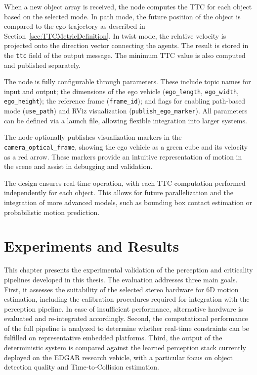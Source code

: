 When a new object array is received, the node computes the TTC 
for each object based on the selected mode. In path mode, the future 
position of the object is compared to the ego trajectory as described 
in Section~\ref{sec:TTCMetricDefinition}. In twist mode, the relative 
velocity is projected onto the direction vector connecting the agents. 
The result is stored in the \texttt{ttc} field of the output message. 
The minimum TTC value is also computed and published separately.

The node is fully configurable through parameters. These include 
topic names for input and output; the dimensions of the ego vehicle 
(\texttt{ego\_length}, \texttt{ego\_width}, \texttt{ego\_height}); the 
reference frame (\texttt{frame\_id}); and flags for enabling path-based 
mode (\texttt{use\_path}) and RViz visualization 
(\texttt{publish\_ego\_marker}). All parameters can be defined via 
a launch file, allowing flexible integration into larger systems.

The node optionally publishes visualization markers in the 
\texttt{camera\_optical\_frame}, showing the ego vehicle as a green 
cube and its velocity as a red arrow. These markers provide an 
intuitive representation of motion in the scene and assist in debugging 
and validation.

The design ensures real-time operation, with each TTC computation 
performed independently for each object. This allows for future 
parallelization and the integration of more advanced models, such as 
bounding box contact estimation or probabilistic motion prediction.






\chapter{Experiments and Results}
\label{chap:ExperimentsAndResults}

This chapter presents the experimental validation of the perception and 
criticality pipelines developed in this thesis. The evaluation addresses three 
main goals. First, it assesses the suitability of the selected stereo hardware 
for 6D motion estimation, including the calibration procedures required for 
integration with the perception pipeline. In case of insufficient performance, 
alternative hardware is evaluated and re-integrated accordingly. Second, the 
computational performance of the full pipeline is analyzed to determine whether 
real-time constraints can be fulfilled on representative embedded platforms. 
Third, the output of the deterministic system is compared against the learned 
perception stack currently deployed on the EDGAR research vehicle, with a 
particular focus on object detection quality and Time-to-Collision estimation.

